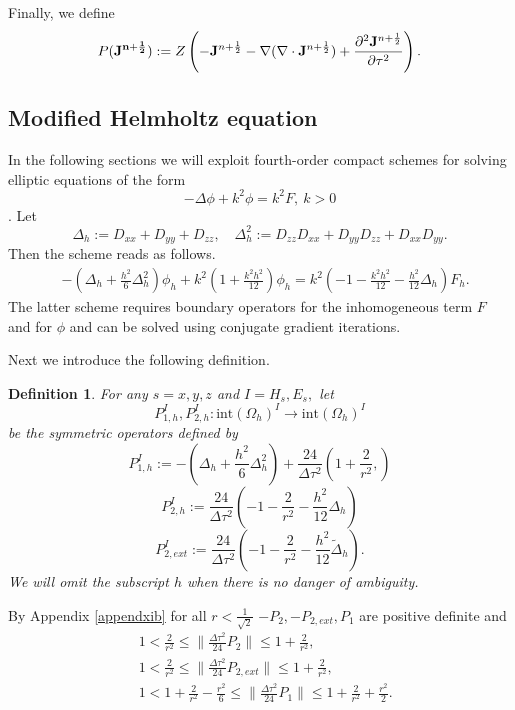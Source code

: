 \documentclass[12pt,reqno]{amsart}
\newtheorem{defi}[theorem]{Definition}
\theoremstyle{definition}
\numberwithin{equation}{section}
\newcommand{\intr}[1]{\mathrm{int}(#1)}
\def\Gwh{\Omega_h}
\begin{document}


	
	Finally, we define 
	$$
	P({\bf J^{n+\frac{1}{2}}}):=Z\left ( -{\bf J}^{n+\frac{1}{2}}-\nabla (\nabla \cdot{\bf J}^{n+\frac{1}{2}})+\frac{\partial^2{\bf J}^{n+\frac{1}{2}}}{\partial \tau^2}\right ).
	$$
   \subsection{Modified Helmholtz equation}\label{subsec:mh}
   In the following sections we will exploit fourth-order compact schemes for solving elliptic equations of the form $$-\Delta \phi+k^2\phi=k^2F, \ k>0$$ \cite{singer_turkel}.
Let 
$$
\Delta_h:=D_{xx}+D_{yy}+D_{zz}, \quad \Delta^2_h:= D_{zz}D_{xx}+D_{yy}D_{zz}+D_{xx}D_{yy}.
$$
Then the scheme reads as follows.
\begin{align*}
	&
	-\left (
	\Delta_h+\frac{h^2}{6}\Delta^2_h
	\right)\phi_h+
	k^2\left (
	1+\frac{k^2h^2}{12}
	\right)\phi_h=
	k^2\left (
	-1-\frac{k^2h^2}{12}
	-\frac{h^2}{12}\Delta_h
	\right)F_h.
\end{align*}
The latter scheme requires boundary operators for the inhomogeneous term $F$ and for $\phi$ and can be solved using conjugate gradient iterations.

Next we introduce the following definition.
	\begin{defi}
	For any $s=x,y,z$ and $I= H_s, E_s,$
	let $$P_{1,h}^{I}, P_{2,h}^{I}:\intr\Gwh^{I}\to \intr\Gwh^{I}$$ be the symmetric operators defined by
	$$
	P_{1,h}^{I}:=-\left (\Delta_h+\frac{h^2}{6}\Delta_h^2\right)+\frac{24}{\Delta \tau^2}\left (
	1+\frac{2}{r^2},
	\right)
	$$
	$$
	P_{2,h}^{I}:=\frac{24}{\Delta \tau^2}\left (
	-1-\frac{2}{r^2}-\frac{h^2}{12}\Delta_h
	\right)
	$$	
		$$
	P_{2,ext}^{I}:=\frac{24}{\Delta \tau^2}\left (
	-1-\frac{2}{r^2}-\frac{h^2}{12}\tilde{\Delta}_h
	\right).
	$$	
We will omit the subscript $h$ when there is no danger of ambiguity.	
	
\end{defi}
By  Appendix \ref{appendxib} for all $r<\frac{1}{\sqrt{2}}$
 $-P_2,-P_{2,ext}, P_1$ are positive definite
and
\begin{align}\label{eq:P1P2estimates}
	&
1<\frac{2}{r^2}\leq \|\frac{\Delta \tau^2}{24}P_2\|\leq 1+\frac{2}{r^2},\\&
1<\frac{2}{r^2}\leq \|\frac{\Delta \tau^2}{24}P_{2,ext}\|\leq 1+\frac{2}{r^2},\\&
1<1+\frac{2}{r^2}-\frac{r^2}{6}\leq\|\frac{\Delta \tau^2}{24}P_1\|\leq 1+\frac{2}{r^2}+\frac{r^2}{2}.
\end{align} 
\end{document}
